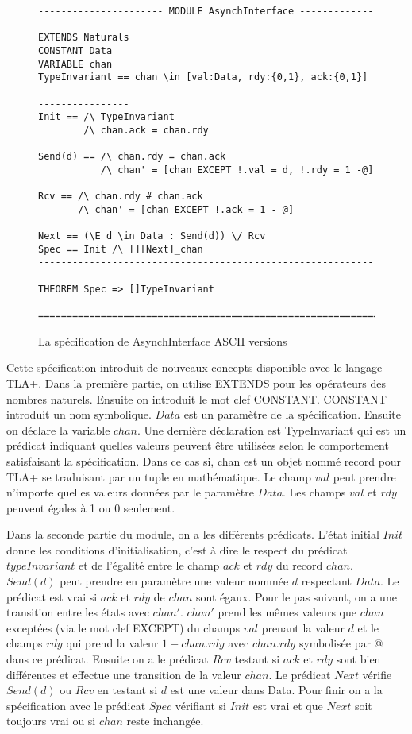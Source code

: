 \documentclass[12pt,a4paper]{article}
\begin{document}
\begin{figure}[ht]
\begin{lstlisting}[frame=single, basicstyle=\footnotesize]
---------------------- MODULE AsynchInterface -----------------------------
EXTENDS Naturals
CONSTANT Data
VARIABLE chan
TypeInvariant == chan \in [val:Data, rdy:{0,1}, ack:{0,1}]
---------------------------------------------------------------------------
Init == /\ TypeInvariant
        /\ chan.ack = chan.rdy
        
Send(d) == /\ chan.rdy = chan.ack
           /\ chan' = [chan EXCEPT !.val = d, !.rdy = 1 -@]
           
Rcv == /\ chan.rdy # chan.ack
       /\ chan' = [chan EXCEPT !.ack = 1 - @]

Next == (\E d \in Data : Send(d)) \/ Rcv
Spec == Init /\ [][Next]_chan
---------------------------------------------------------------------------
THEOREM Spec => []TypeInvariant       

===========================================================================
\end{lstlisting}
\caption{La spécification de AsynchInterface ASCII versions}
\end{figure}

Cette spécification introduit de nouveaux concepts disponible avec le langage TLA+. Dans la première partie, on utilise EXTENDS pour les opérateurs des nombres naturels. Ensuite on introduit le mot clef CONSTANT. CONSTANT introduit un nom symbolique. $Data$ est un paramètre de la spécification.
Ensuite on déclare la variable $chan$. Une dernière déclaration est TypeInvariant qui est un prédicat indiquant quelles valeurs peuvent être utilisées selon le comportement satisfaisant la spécification. Dans ce cas si, chan est un objet nommé record pour TLA+ se traduisant par un tuple en mathématique. Le champ $val$ peut prendre n'importe quelles valeurs données par le paramètre $Data$. Les champs $val$ et $rdy$ peuvent égales à 1 ou 0 seulement.

Dans la seconde partie du module, on a les différents prédicats. L'état initial $Init$ donne les conditions d'initialisation, c'est à dire le respect du prédicat $typeInvariant$ et de l'égalité entre le champ $ack$ et $rdy$ du record $chan$. $Send(d)$ peut prendre en paramètre une valeur nommée $d$ respectant $Data$. Le prédicat est vrai si $ack$ et $rdy$ de $chan$ sont égaux. Pour le pas suivant, on a une transition entre les états avec $chan'$. $chan'$ prend les mêmes valeurs que $chan$ exceptées (via le mot clef EXCEPT) du champs $val$ prenant la valeur $d$ et le champs $rdy$ qui prend la valeur $1 - chan.rdy$ avec $chan.rdy$ symbolisée par @ dans ce prédicat.
Ensuite on a le prédicat $Rcv$ testant si $ack$ et $rdy$ sont bien différentes et effectue une transition de la valeur $chan$.
Le prédicat $Next$ vérifie $Send(d)$ ou $Rcv$ en testant si $d$ est une valeur dans Data. Pour finir on a la spécification avec le prédicat $Spec$ vérifiant si $Init$ est vrai et que $Next$ soit toujours vrai ou si $chan$ reste inchangée.
\end{document}
